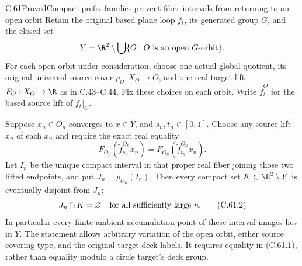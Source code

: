 \begin{claim}{C.61}{Proved}{Compact prefix families prevent fiber intervals from returning to an open orbit}
Retain the original based plane loop $f_t$, its
generated group $G$, and the closed set
\[
 Y=\R^2\setminus\bigcup\{O:O\text{ is an open }G\text{-orbit}\}.
\]
For each open orbit under consideration, choose one
actual global quotient, its original universal
source cover $p_O:X_O\to O$, and one real target
lift $F_O:X_O\to\R$ as in C.43--C.44.
Fix these choices on each orbit.
Write $\widetilde f_t^O$ for the based source lift
of $f_t|_O$.

Suppose $x_n\in O_n$ converges to $x\in Y$, and
$s_n,t_n\in[0,1]$. Choose any source lift
$\widetilde x_n$ of each $x_n$ and require the
exact real equality
\[
 F_{O_n}(\widetilde f_{s_n}^{O_n}\widetilde x_n)
   =F_{O_n}(\widetilde f_{t_n}^{O_n}\widetilde x_n).
                                                               \tag{C.61.1}
\]
Let $I_n$ be the unique compact interval in that
proper real fiber joining those two lifted
endpoints, and put $J_n=p_{O_n}(I_n)$.
Then every compact set $K\subset\R^2\setminus Y$
is eventually disjoint from $J_n$:
\[
                  J_n\cap K=\varnothing
                      \quad\hbox{for all sufficiently large }n.
                                                               \tag{C.61.2}
\]
In particular every finite ambient accumulation
point of these interval images lies in $Y$.
The statement allows arbitrary variation of the
open orbit, either source covering type, and the
original target deck labels. It requires equality
in (C.61.1), rather than equality modulo a circle
target's deck group.
\end{claim}

